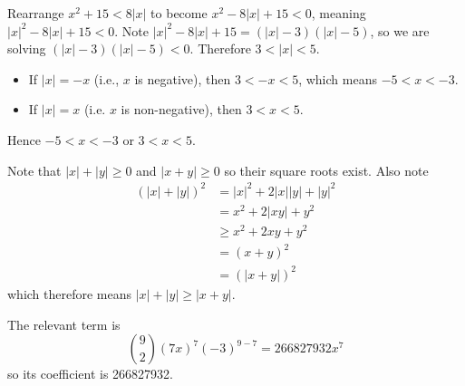 \begin{questions}
    \item Rearrange $x^2 + 15 < 8|x|$ to become $x^2 - 8|x| + 15 < 0$, meaning $|x|^2 - 8|x| + 15 < 0$. Note $|x|^2 - 8|x| + 15 = (|x|-3)(|x|-5)$, so we are solving $(|x|-3)(|x|-5)<0$. Therefore $3 < |x| < 5$.
    \begin{itemize}
        \item If $|x| = -x$ (i.e., $x$ is negative), then $3 < -x < 5$, which means $-5 < x < -3$.
        \item If $|x| = x$ (i.e. $x$ is non-negative), then $3 < x < 5$.
    \end{itemize}
    Hence $-5 < x < -3$ or $3 < x < 5$.

    \item Note that $|x| + |y| \geq 0$ and $|x + y| \geq 0$ so their square roots exist. Also note
    \begin{align*}
        \left(|x| + |y|\right)^2 &= |x|^2 + 2|x||y| + |y|^2\\
        &= x^2 + 2|xy| + y^2\\
        &\geq x^2 + 2xy + y^2\\
        &= (x+y)^2\\
        &= \left(|x+y|\right)^2
    \end{align*}
    which therefore means $|x| + |y| \geq |x+y|$.

    \item The relevant term is
    \[
        {9 \choose 2}(7x)^7(-3)^{9-7} = 266827932x^7
    \]
    so its coefficient is 266827932.
\end{questions}

